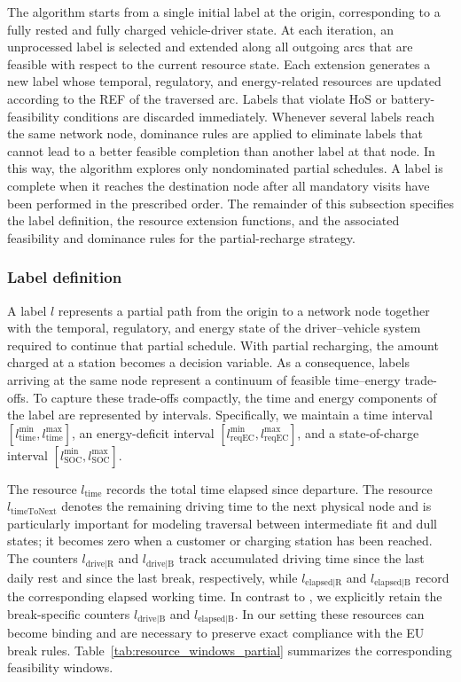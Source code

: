 \documentclass[3p,11pt,authoryear]{elsarticle}  %
\begin{document}
The algorithm starts from a single initial label at the origin, corresponding to a fully rested and fully charged vehicle-driver state. At each iteration, an unprocessed label is selected and extended along all outgoing arcs that are feasible with respect to the current resource state. Each extension generates a new label whose temporal, regulatory, and energy-related resources are updated according to the REF of the traversed arc. Labels that violate HoS or battery-feasibility conditions are discarded immediately. Whenever several labels reach the same network node, dominance rules are applied to eliminate labels that cannot lead to a better feasible completion than another label at that node. In this way, the algorithm explores only nondominated partial schedules. A label is complete when it reaches the destination node after all mandatory visits have been performed in the prescribed order. The remainder of this subsection specifies the label definition, the resource extension functions, and the associated feasibility and dominance rules for the partial-recharge strategy.


\subsubsection{Label definition}


A label \(l\) represents a partial path from the origin to a network node together with the temporal, regulatory, and energy state of the driver--vehicle system required to continue that partial schedule. With partial recharging, the amount charged at a station becomes a decision variable. As a consequence, labels arriving at the same node represent a continuum of feasible time--energy trade-offs. To capture these trade-offs compactly, the time and energy components of the label are represented by intervals. Specifically, we maintain a time interval \([l_{\text{time}}^{\min},l_{\text{time}}^{\max}]\), an energy-deficit interval \([l_{\text{reqEC}}^{\min},l_{\text{reqEC}}^{\max}]\), and a state-of-charge interval \([l_{\text{SOC}}^{\min},l_{\text{SOC}}^{\max}]\).

The resource \(l_{\text{time}}\) records the total time elapsed since departure. The resource \(l_{\text{timeToNext}}\) denotes the remaining driving time to the next physical node and is particularly important for modeling traversal between intermediate fit and dull states; it becomes zero when a customer or charging station has been reached. The counters \(l_{\text{drive|R}}\) and \(l_{\text{drive|B}}\) track accumulated driving time since the last daily rest and since the last break, respectively, while \(l_{\text{elapsed|R}}\) and \(l_{\text{elapsed|B}}\) record the corresponding elapsed working time. In contrast to \citet{goel2017exact}, we explicitly retain the break-specific counters \(l_{\text{drive|B}}\) and \(l_{\text{elapsed|B}}\). In our setting these resources can become binding and are necessary to preserve exact compliance with the EU break rules. Table~\ref{tab:resource_windows_partial} summarizes the corresponding feasibility windows.
\end{document}
